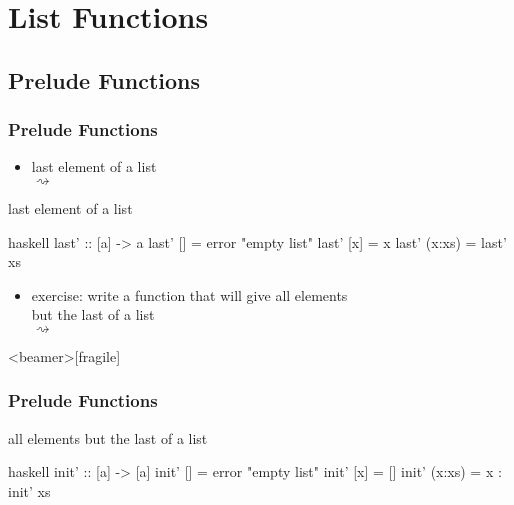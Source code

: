 \documentclass[dvipsnames]{beamer}
\theoremstyle{plain}
\begin{document}
\section{List Functions}

\subsection{Prelude Functions}

\begin{frame}[fragile]
  \frametitle{Prelude Functions}

  \begin{itemize}
    \item last element of a list\\
       $\rightsquigarrow$
  \end{itemize}

  \begin{exampleblock}{last element of a list}
    \begin{pygments}{haskell}
last' :: [a] -> a
last' [] = error "empty list"
last' [x] = x
last' (x:xs) = last' xs
    \end{pygments}
  \end{exampleblock}

  \pause
  \begin{itemize}
    \item exercise: write a function that will give all elements\\
      but the last of a list\\
       $\rightsquigarrow$
  \end{itemize}
\end{frame}

\begin{frame}<beamer>[fragile]
  \frametitle{Prelude Functions}

  \begin{exampleblock}{all elements but the last of a list}
    \begin{pygments}{haskell}
init' :: [a] -> [a]
init' [] = error "empty list"
init' [x] = []
init' (x:xs) = x : init' xs
    \end{pygments}
  \end{exampleblock}
\end{frame}
\end{document}
